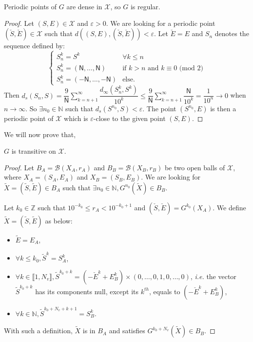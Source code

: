 \documentclass{llncs}
\begin{document}
\begin{proposition}
Periodic points of $G$ are dense in $\mathcal{X}$, so $G$ is regular.
\end{proposition}


\begin{proof}
Let $(S,E) \in \mathcal{X}$ and $\varepsilon > 0$. We are looking for a periodic point $(\check{S}, \check{E}) \in \mathcal{X}$ such that $d\left((S,E), (\check{S},\check{E})\right) < \varepsilon$. Let $\check{E} = E$ and $S_n$ denotes the sequence defined by:
$$\left\{ 
\begin{array}{ll}
S_n^k = S^k & \forall k \leqslant n \\
S_n^k = (\mathsf{N}, \hdots, \mathsf{N}) & \textrm{if } k>n \textrm{ and } k \equiv 0 \textrm{ (mod } 2 \textrm{)} \\
S_n^k = (-\mathsf{N}, \hdots, -\mathsf{N}) & \textrm{else.}
\end{array}
\right.$$
Then $d_s(S_n, S) = \displaystyle{\dfrac{9}{\mathsf{N}}\sum_{k=n+1}^{\infty }\dfrac{d_{\infty}(S_n^k, S^k)}{10^{k}}} \leqslant \displaystyle{\dfrac{9}{\mathsf{N}}\sum_{k=n+1}^{\infty }\dfrac{\mathsf{N}}{10^k}} = \dfrac{1}{10^n} \rightarrow 0$ when \linebreak $n \rightarrow \infty$. So $\exists n_0 \in \mathds{N}$ such that $d_s(S^{n_0}, S) < \varepsilon$. The point $(S^{n_0}, E)$ is then a periodic point of $\mathcal{X}$ which is $\varepsilon$-close to the given point $(S,E)$.
\end{proof}


We will now prove that,

\begin{proposition}
$G$ is transitive on $\mathcal{X}$.
\end{proposition}


\begin{proof}
Let $B_A = \mathcal{B}\left(X_A,r_A\right)$ and $B_B = \mathcal{B}\left(X_B,r_B\right)$ be two open balls of $\mathcal{X}$, where $X_A=(S_A,E_A)$ and $X_B=(S_B,E_B)$. We are looking for $\tilde{X}=(\tilde{S},\tilde{E}) \in B_A$ such that $\exists n_0 \in \mathds{N}, G^{n_0} ( \tilde{X} ) \in B_B$.

Let $k_0 \in \mathds{Z}$ such that $10^{-k_0}\leqslant r_A < 10^{-k_0+1}$ and $\left(\check{S}, \check{E}\right) = G^{k_0} \left( X_A \right)$. We define $\tilde{X} = (\tilde{S},\tilde{E})$ as below:
\begin{itemize}
\item $\tilde{E} = E_A$,
\item $\forall k \leqslant k_0, \tilde{S}^k = S_A^k$,
\item $\forall k \in \llbracket 1, N_v \rrbracket, \tilde{S}^{k_0+k} = (-\check{E}^k+E_B^k) \times (0, \hdots, 0, 1, 0,\hdots, 0)$, \emph{i.e.} the vector $\tilde{S}^{k_0+k}$ has its components null, except its $k^{th}$, equals to $(-\check{E}^k+E_B^k)$,
\item $\forall k \in \mathds{N}, \tilde{S}^{k_0+N_v+k+1} = S_B^k$.
\end{itemize}
With such a definition, $\tilde{X}$ is in $B_A$ and satisfies $G^{k_0+N_v} \left(\tilde{X} \right) \in B_B$.
\end{proof}
\end{document}

